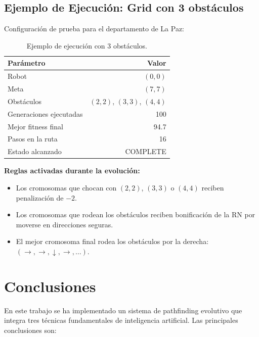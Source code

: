 \documentclass[12pt,a4paper]{article}
\begin{document}
\subsection{Ejemplo de Ejecuci\'on: Grid con 3 obst\'aculos}

Configuraci\'on de prueba para el departamento de La Paz:

\begin{table}[H]
\centering
\caption{Ejemplo de ejecuci\'on con 3 obst\'aculos.}
\label{tab:ejemplo}
\begin{tabular}{l r}
\toprule
\textbf{Par\'ametro} & \textbf{Valor} \\
\midrule
Robot & $(0,0)$ \\
Meta & $(7,7)$ \\
Obst\'aculos & $(2,2)$, $(3,3)$, $(4,4)$ \\
Generaciones ejecutadas & 100 \\
Mejor fitness final & 94.7 \\
Pasos en la ruta & 16 \\
Estado alcanzado & COMPLETE \\
\bottomrule
\end{tabular}
\end{table}

\textbf{Reglas activadas durante la evoluci\'on:}
\begin{itemize}
  \item Los cromosomas que chocan con $(2,2)$, $(3,3)$ o $(4,4)$ reciben penalizaci\'on de $-2$.
  \item Los cromosomas que rodean los obst\'aculos reciben bonificaci\'on de la RN por moverse en direcciones seguras.
  \item El mejor cromosoma final rodea los obst\'aculos por la derecha: $(\rightarrow, \rightarrow, \downarrow, \rightarrow, \dots)$.
\end{itemize}

\section{Conclusiones}

En este trabajo se ha implementado un sistema de pathfinding evolutivo que integra tres t\'ecnicas fundamentales de inteligencia artificial. Las principales conclusiones son:
\end{document}
